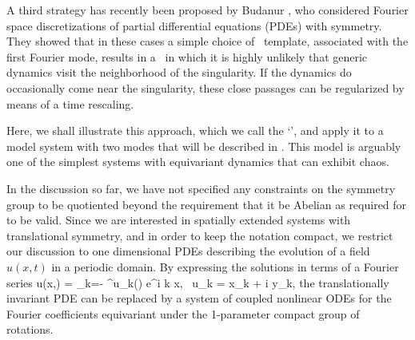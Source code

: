 A third strategy has recently been proposed by Budanur
\etal{}, who considered Fourier space discretizations of
partial differential equations (PDEs) with  symmetry. They showed
that in these cases a simple choice of \slice\ template, associated with
the first Fourier mode, results in a \slice\ in which it is highly
unlikely that generic dynamics visit the neighborhood of the singularity.
If the dynamics do occasionally come near the singularity, these close
passages can be regularized by means of a time rescaling.

Here, we shall illustrate this approach, which we call the `\fFslice',
and apply it to a model system with two modes that will be described in .
This model is arguably one of the simplest systems with  equivariant dynamics that can
exhibit chaos.

In the discussion so far, we have not specified any constraints on the symmetry group
to be quotiented beyond the requirement that it be Abelian as required for 
to be valid. Since we are interested in spatially extended systems with
translational symmetry, and in order to keep the notation compact,
we restrict our discussion to one dimensional PDEs describing
the evolution of a field $u(x,t)$ in a periodic domain.
By expressing the solutions in terms of a Fourier series
\beq
	u(x,\zeit) = \sum\limits_{k=- \infty}^\infty u_k\left(\zeit\right) e^{i k x}, \,\,\,u_k = x_k + i y_k,
the translationally invariant PDE can be replaced by a system of coupled nonlinear
ODEs for the Fourier coefficients equivariant under the 1-parameter compact group of  rotations.

